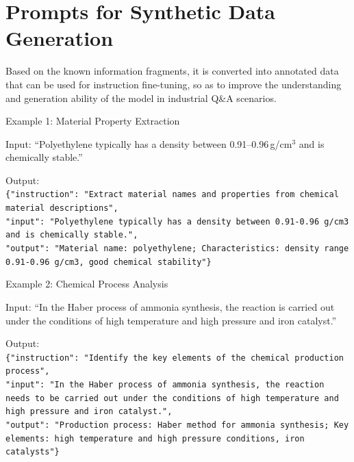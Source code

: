 \documentclass[preprint,12pt]{elsarticle}
\def\textbf#1{#1}%
\def\textit#1{#1}%
\begin{document}
\clearpage
\appendix

\section{Prompts for Synthetic Data Generation}\label{sec:appendixA}
    \begin{tcolorbox}[
      colback=gray!5!white,
      colframe=gray!40!black,
      boxrule=0.6pt,
      arc=2pt,
      left=2mm, right=2mm, top=1mm, bottom=1mm,  %
      width=\linewidth,
      fontupper=\fontsize{7pt}{9pt}\selectfont,  %
      title=\textbf{Task Objectives}]
    Based on the known information fragments, it is converted into annotated data that can be used for instruction fine-tuning, so as to improve the understanding and generation ability of the model in industrial Q\&A scenarios.

    \medskip
    \noindent\textbf{Example 1: Material Property Extraction}

    \noindent\textbf{Input:} \textit{``Polyethylene typically has a density between 0.91--0.96\,g/cm$^3$ and is chemically stable.''}

    \noindent\textbf{Output:}\\
    \texttt{\{"instruction": "Extract material names and properties from chemical material descriptions",}\\
    \texttt{"input": "Polyethylene typically has a density between 0.91-0.96 g/cm3 and is chemically stable.",}\\
    \texttt{"output": "Material name: polyethylene; Characteristics: density range 0.91-0.96 g/cm3, good chemical stability"\}}

    \medskip
    \noindent\textbf{Example 2: Chemical Process Analysis}

    \noindent\textbf{Input:} \textit{``In the Haber process of ammonia synthesis, the reaction is carried out under the conditions of high temperature and high pressure and iron catalyst.''}

    \noindent\textbf{Output:}\\
    \texttt{\{"instruction": "Identify the key elements of the chemical production process",}\\
    \texttt{"input": "In the Haber process of ammonia synthesis, the reaction needs to be carried out under the conditions of high temperature and high pressure and iron catalyst.",}\\
    \texttt{"output": "Production process: Haber method for ammonia synthesis; Key elements: high temperature and high pressure conditions, iron catalysts"\}}


\end{tcolorbox}
\end{document}
